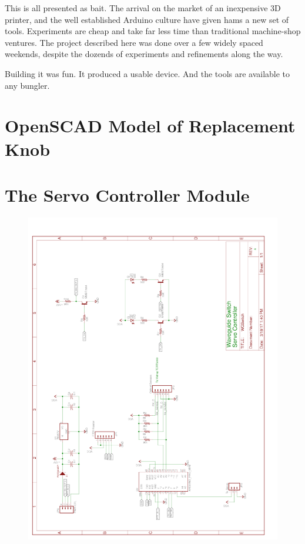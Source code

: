 \documentclass[12pt]{article}
\begin{document}
This is all presented as bait.  The arrival on the market of
an inexpensive 3D printer, and the well established Arduino
culture have given hams a new set of tools.  Experiments are
cheap and take far less time than traditional machine-shop
ventures. The project described here was done over a few
widely spaced weekends, despite the dozends of experiments
and refinements along the way.

Building it was fun. It produced a usable device. And the
tools are available to any bungler.

\clearpage

\begin{appendices}
\section{\label{a_knob_list}OpenSCAD Model of Replacement Knob}


\section{\label{a_controller_module}The Servo Controller Module}
\begin{figure}[h] 
  \centering
  \includegraphics[width=0.75\linewidth,keepaspectratio]{WGSwitch.pdf}
\end{figure}


\end{appendices}
\end{document}
